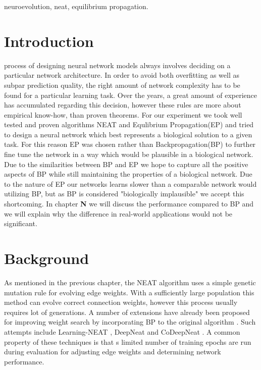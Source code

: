 \documentclass[lettersize,journal]{IEEEtran}
\begin{document}

\begin{IEEEkeywords}
neuroevolution, neat, equilibrium propagation.
\end{IEEEkeywords}

\section{Introduction}
 process of designing neural network models always involves deciding on a particular network architecture. In order to avoid both overfitting as well as subpar prediction quality, the right amount of network complexity has to be found for a particular learning task. Over the years, a great amount of experience has accumulated regarding this decision, however these rules are more about empirical know-how, than proven theorems. For our experiment we took well tested and proven algorithms NEAT and Equlibrium Propagation(EP)\cite{eqprop} and tried to design a neural network which best represents a biological solution to a given task. For this reason EP was chosen rather than Backpropagation(BP)\cite{backprop} to further fine tune the network in a way which would be plausible in a biological network. Due to the similarities between BP and EP we hope to capture all the positive aspects of BP while still maintaining the properties of a biological network. Due to the nature of EP our networks learns slower than a comparable network would utilizing BP, but as BP is considered "biologically implausible" we accept this shortcoming. In chapter \textbf{N} we will discuss the performance compared to BP and we will explain why the difference in real-world applications would not be significant.

\section{Background}
As mentioned in the previous chapter, the NEAT algorithm uses a simple genetic mutation rule for evolving edge weights. With a sufficiently large population this method can evolve correct connection weights, however this process usually requires lot of generations. A number of extensions have already been proposed for improving weight search by incorporating BP to the original algorithm \cite{neatsurvey}. Such attempts include Learning-NEAT \cite{lneat}, DeepNeat and CoDeepNeat \cite{codeepneat}. A common property of these techniques is that s limited number of training epochs are run during evaluation for adjusting edge weights and determining network performance. 
\end{document}
